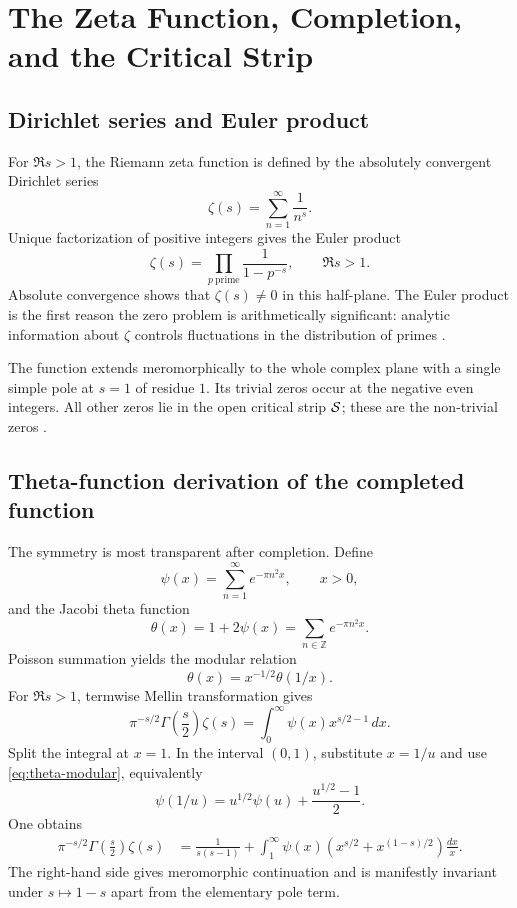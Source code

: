 \chapter{The Zeta Function, Completion, and the Critical Strip}
\label{chap:zeta}

\section{Dirichlet series and Euler product}

For $\Re s>1$, the Riemann zeta function is defined by the absolutely convergent Dirichlet series
\begin{equation}
 \zeta(s)=\sum_{n=1}^{\infty}\frac{1}{n^s}.
 \label{eq:zeta-dirichlet}
\end{equation}
Unique factorization of positive integers gives the Euler product
\begin{equation}
 \zeta(s)=\prod_{p\ \mathrm{prime}}\frac{1}{1-p^{-s}},
 \qquad \Re s>1.
 \label{eq:euler-product}
\end{equation}
Absolute convergence shows that $\zeta(s)\neq0$ in this half-plane. The Euler product is the first reason the zero problem is arithmetically significant: analytic information about $\zeta$ controls fluctuations in the distribution of primes \citep{riemann1859,titchmarsh1986,edwards1974}.

The function extends meromorphically to the whole complex plane with a single simple pole at $s=1$ of residue $1$. Its trivial zeros occur at the negative even integers. All other zeros lie in the open critical strip $\mathcal{S}$; these are the non-trivial zeros \citep{dlmf2026}.

\section{Theta-function derivation of the completed function}

The symmetry is most transparent after completion. Define
\[
 \psi(x)=\sum_{n=1}^{\infty}e^{-\pi n^2x},\qquad x>0,
\]
and the Jacobi theta function
\[
 \theta(x)=1+2\psi(x)=\sum_{n\in\mathbb Z}e^{-\pi n^2x}.
\]
Poisson summation yields the modular relation
\begin{equation}
 \theta(x)=x^{-1/2}\theta(1/x).
 \label{eq:theta-modular}
\end{equation}
For $\Re s>1$, termwise Mellin transformation gives
\begin{equation}
 \pi^{-s/2}\Gamma\!\left(\frac{s}{2}\right)\zeta(s)
 =\int_0^{\infty}\psi(x)x^{s/2-1}\,dx.
 \label{eq:mellin-zeta}
\end{equation}
Split the integral at $x=1$. In the interval $(0,1)$, substitute $x=1/u$ and use \cref{eq:theta-modular}, equivalently
\[
 \psi(1/u)=u^{1/2}\psi(u)+\frac{u^{1/2}-1}{2}.
\]
One obtains
\begin{align}
 \pi^{-s/2}\Gamma\!\left(\frac{s}{2}\right)\zeta(s)
 &=\frac{1}{s(s-1)}
 +\int_1^{\infty}\psi(x)
 \left(x^{s/2}+x^{(1-s)/2}\right)\frac{dx}{x}.
 \label{eq:completed-integral-pre}
\end{align}
The right-hand side gives meromorphic continuation and is manifestly invariant under $s\mapsto1-s$ apart from the elementary pole term.

